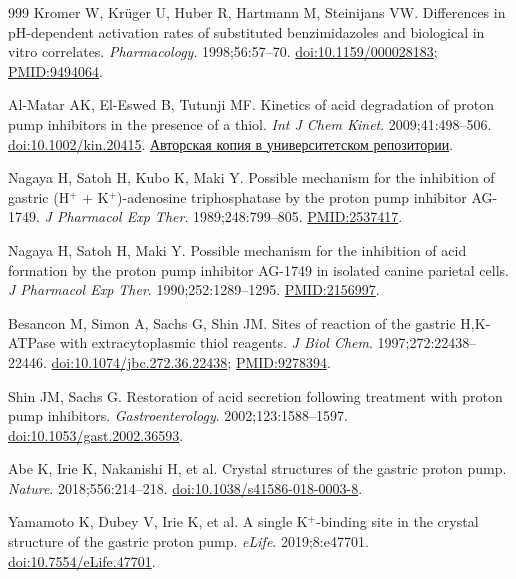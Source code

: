 \documentclass[11pt,a4paper,notitlepage]{report}
\begin{document}
\begin{thebibliography}{999}
 Kromer W, Krüger U, Huber R, Hartmann M, Steinijans VW. Differences in pH-dependent activation rates of substituted benzimidazoles and biological in vitro correlates. \textit{Pharmacology}. 1998;56:57--70. \href{https://doi.org/10.1159/000028183}{doi:10.1159/000028183}; \href{https://pubmed.ncbi.nlm.nih.gov/9494064/}{PMID:9494064}.

 Al-Matar AK, El-Eswed B, Tutunji MF. Kinetics of acid degradation of proton pump inhibitors in the presence of a thiol. \textit{Int J Chem Kinet}. 2009;41:498--506. \href{https://doi.org/10.1002/kin.20415}{doi:10.1002/kin.20415}. \href{https://eacademic.ju.edu.jo/maha.tutunji/Lists/Published%20Research/Attachments/37/Abstract.pdf}{Авторская копия в университетском репозитории}.

 Nagaya H, Satoh H, Kubo K, Maki Y. Possible mechanism for the inhibition of gastric (H$^+$ + K$^+$)-adenosine triphosphatase by the proton pump inhibitor AG-1749. \textit{J Pharmacol Exp Ther}. 1989;248:799--805. \href{https://pubmed.ncbi.nlm.nih.gov/2537417/}{PMID:2537417}.

 Nagaya H, Satoh H, Maki Y. Possible mechanism for the inhibition of acid formation by the proton pump inhibitor AG-1749 in isolated canine parietal cells. \textit{J Pharmacol Exp Ther}. 1990;252:1289--1295. \href{https://pubmed.ncbi.nlm.nih.gov/2156997/}{PMID:2156997}.

 Besancon M, Simon A, Sachs G, Shin JM. Sites of reaction of the gastric H,K-ATPase with extracytoplasmic thiol reagents. \textit{J Biol Chem}. 1997;272:22438--22446. \href{https://doi.org/10.1074/jbc.272.36.22438}{doi:10.1074/jbc.272.36.22438}; \href{https://pubmed.ncbi.nlm.nih.gov/9278394/}{PMID:9278394}.

 Shin JM, Sachs G. Restoration of acid secretion following treatment with proton pump inhibitors. \textit{Gastroenterology}. 2002;123:1588--1597. \href{https://doi.org/10.1053/gast.2002.36593}{doi:10.1053/gast.2002.36593}.

 Abe K, Irie K, Nakanishi H, et al. Crystal structures of the gastric proton pump. \textit{Nature}. 2018;556:214--218. \href{https://doi.org/10.1038/s41586-018-0003-8}{doi:10.1038/s41586-018-0003-8}.

 Yamamoto K, Dubey V, Irie K, et al. A single K$^+$-binding site in the crystal structure of the gastric proton pump. \textit{eLife}. 2019;8:e47701. \href{https://doi.org/10.7554/eLife.47701}{doi:10.7554/eLife.47701}.


\end{thebibliography}
\end{document}
